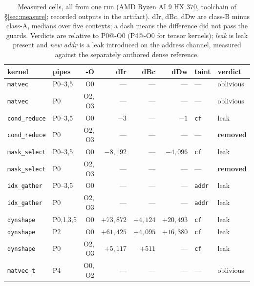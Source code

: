 \begin{table}[H]
\caption{Measured cells, all from one run (AMD Ryzen AI 9 HX 370, toolchain of
\S\ref{sec:measure}; recorded outputs in the artifact). dIr, dBc, dDw are class-B minus
class-A, medians over five contexts; a dash means the difference did not pass the guards.
Verdicts are relative to P0@-O0 (P4@-O0 for tensor kernels); \emph{leak} is leak present
and \emph{new addr} is a leak introduced on the address channel, measured against the
separately authored dense reference.}
\label{tab:measured-cells}
\centering
\scriptsize
\setlength{\tabcolsep}{1.5pt}
\begin{tabular}{@{}llrrrrll@{}}
\hline
kernel & pipes & -O & dIr & dBc & dDw & taint & verdict \\
\hline
\texttt{matvec}          & P0--3,5  & O0     & ---          & ---        & ---         & ---           & oblivious \\
\texttt{matvec}          & P0       & O2, O3 & ---          & ---        & ---         & ---           & oblivious \\
\texttt{cond\_reduce}    & P0--3,5  & O0     & $-3$         & ---        & $-1$        & \texttt{cf}   & leak \\
\texttt{cond\_reduce}    & P0       & O2, O3 & ---          & ---        & ---         & ---           & \textbf{removed} \\
\texttt{mask\_select}    & P0--3,5  & O0     & $-8{,}192$   & ---        & $-4{,}096$  & \texttt{cf}   & leak \\
\texttt{mask\_select}    & P0       & O2, O3 & ---          & ---        & ---         & ---           & \textbf{removed} \\
\texttt{idx\_gather}     & P0--3,5  & O0     & ---          & ---        & ---         & \texttt{addr} & leak \\
\texttt{idx\_gather}     & P0       & O2, O3 & ---          & ---        & ---         & \texttt{addr} & leak \\
\texttt{dynshape}        & P0,1,3,5 & O0     & $+73{,}872$  & $+4{,}124$ & $+20{,}493$ & \texttt{cf}   & leak \\
\texttt{dynshape}        & P2       & O0     & $+61{,}425$  & $+4{,}095$ & $+16{,}380$ & \texttt{cf}   & leak \\
\texttt{dynshape}        & P0       & O2, O3 & $+5{,}117$   & $+511$     & ---         & \texttt{cf}   & leak \\
\texttt{matvec\_t}       & P4       & O0, O2 & ---          & ---        & ---         & ---           & oblivious \\

\end{tabular}
\end{table}
